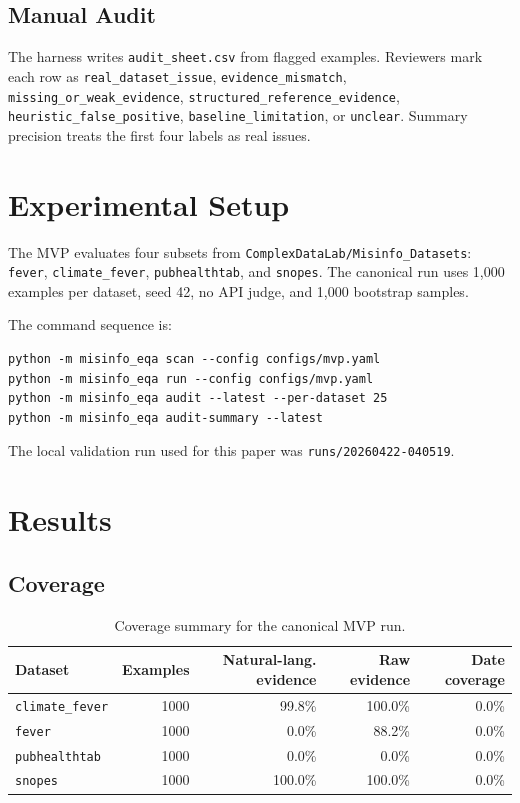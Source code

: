 \documentclass[11pt]{article}
\begin{document}
\subsection{Manual Audit}

The harness writes \texttt{audit\_sheet.csv} from flagged examples. Reviewers
mark each row as \texttt{real\_dataset\_issue}, \texttt{evidence\_mismatch},
\texttt{missing\_or\_weak\_evidence}, \texttt{structured\_reference\_evidence},
\texttt{heuristic\_false\_positive}, \texttt{baseline\_limitation}, or
\texttt{unclear}. Summary precision treats the first four labels as real issues.

\section{Experimental Setup}

The MVP evaluates four subsets from
\texttt{ComplexDataLab/Misinfo\_Datasets}: \texttt{fever},
\texttt{climate\_fever}, \texttt{pubhealthtab}, and \texttt{snopes}. The
canonical run uses 1,000 examples per dataset, seed 42, no API judge, and 1,000
bootstrap samples.

The command sequence is:

\begin{verbatim}
python -m misinfo_eqa scan --config configs/mvp.yaml
python -m misinfo_eqa run --config configs/mvp.yaml
python -m misinfo_eqa audit --latest --per-dataset 25
python -m misinfo_eqa audit-summary --latest
\end{verbatim}

The local validation run used for this paper was \texttt{runs/20260422-040519}.

\section{Results}

\subsection{Coverage}

\begin{table}[h]
\centering
\small
\begin{tabular}{lrrrr}
\toprule
Dataset & Examples & Natural-lang. evidence & Raw evidence & Date coverage \\
\midrule
\texttt{climate\_fever} & 1000 & 99.8\% & 100.0\% & 0.0\% \\
\texttt{fever} & 1000 & 0.0\% & 88.2\% & 0.0\% \\
\texttt{pubhealthtab} & 1000 & 0.0\% & 0.0\% & 0.0\% \\
\texttt{snopes} & 1000 & 100.0\% & 100.0\% & 0.0\% \\
\bottomrule
\end{tabular}
\caption{Coverage summary for the canonical MVP run.}
\label{tab:coverage}
\end{table}
\end{document}
